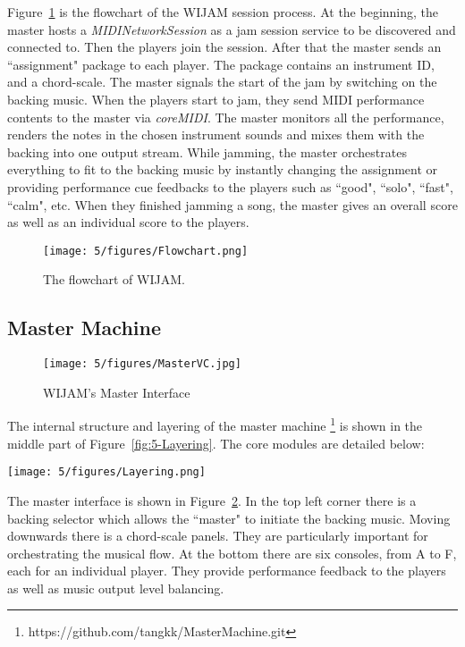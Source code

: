 Figure~\ref{fig:5-FlowChart} is the flowchart of the WIJAM session process. At the beginning, the master hosts a \textit{MIDINetworkSession} as a jam session service to be discovered and connected to. Then the players join the session. After that the master sends an ``assignment" package to each player. The package contains an instrument ID, and a chord-scale. The master signals the start of the jam by switching on the backing music. When the players start to jam, they send MIDI performance contents to the master via \textit{coreMIDI}. The master monitors all the performance, renders the notes in the chosen instrument sounds and mixes them with the backing into one output stream. While jamming, the master orchestrates everything to fit to the backing music by instantly changing the assignment or providing performance cue feedbacks to the players such as ``good", ``solo", ``fast", ``calm", etc. When they finished jamming a song, the master gives an overall score as well as an individual score to the players.
\begin{figure}[htbp]
    \centering
        \texttt{[image: 5/figures/Flowchart.png]}
    \caption{The flowchart of WIJAM.}
    \label{fig:5-FlowChart}
\end{figure}

\subsection{Master Machine}

\begin{figure}[htbp]
    \centering
        \texttt{[image: 5/figures/MasterVC.jpg]}
    \caption{WIJAM's Master Interface}
    \label{fig:5-MasterVC}
\end{figure}

The internal structure and layering of the master machine \footnote{https://github.com/tangkk/MasterMachine.git} is shown in the middle part
of Figure~\ref{fig:5-Layering}. The core modules are detailed below:
\begin{figure*}[htbp]
    \centering
        \texttt{[image: 5/figures/Layering.png]}
    \caption{The internal layering and structure of WIJAM. The data flows from the master machine (middle) to the player machine (right) through the bidirectional communication channel, and vice versa.}
    \label{fig:5-Layering}
\end{figure*}

The master interface is shown in Figure~\ref{fig:5-MasterVC}. In the top left corner there is a backing selector which allows the ``master" to initiate the backing music. Moving downwards there is a chord-scale panels. They are particularly important for orchestrating the musical flow. At the bottom there are six consoles, from A to F, each for an individual player. They provide performance feedback to the players as well as music output level balancing.


